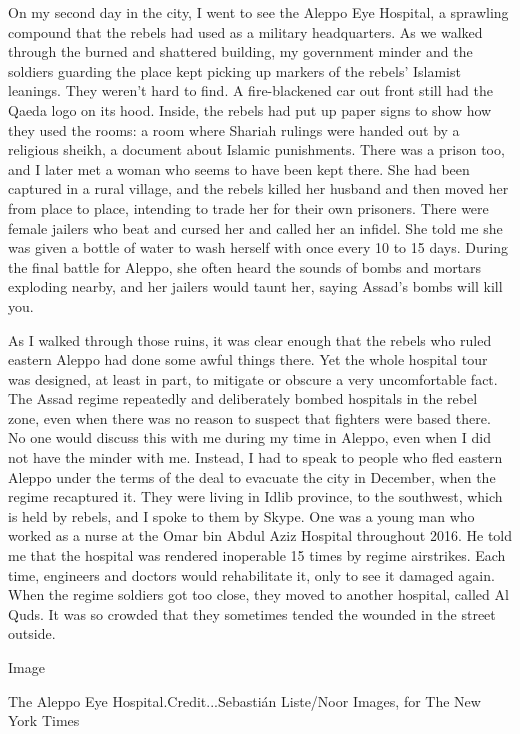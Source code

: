 On my second day in the city, I went to see the Aleppo Eye Hospital, a
sprawling compound that the rebels had used as a military headquarters.
As we walked through the burned and shattered building, my government
minder and the soldiers guarding the place kept picking up markers of
the rebels' Islamist leanings. They weren't hard to find. A
fire-blackened car out front still had the Qaeda logo on its hood.
Inside, the rebels had put up paper signs to show how they used the
rooms: a room where Shariah rulings were handed out by a religious
sheikh, a document about Islamic punishments. There was a prison too,
and I later met a woman who seems to have been kept there. She had been
captured in a rural village, and the rebels killed her husband and then
moved her from place to place, intending to trade her for their own
prisoners. There were female jailers who beat and cursed her and called
her an infidel. She told me she was given a bottle of water to wash
herself with once every 10 to 15 days. During the final battle for
Aleppo, she often heard the sounds of bombs and mortars exploding
nearby, and her jailers would taunt her, saying Assad's bombs will kill
you.

As I walked through those ruins, it was clear enough that the rebels who
ruled eastern Aleppo had done some awful things there. Yet the whole
hospital tour was designed, at least in part, to mitigate or obscure a
very uncomfortable fact. The Assad regime repeatedly and deliberately
bombed hospitals in the rebel zone, even when there was no reason to
suspect that fighters were based there. No one would discuss this with
me during my time in Aleppo, even when I did not have the minder with
me. Instead, I had to speak to people who fled eastern Aleppo under the
terms of the deal to evacuate the city in December, when the regime
recaptured it. They were living in Idlib province, to the southwest,
which is held by rebels, and I spoke to them by Skype. One was a young
man who worked as a nurse at the Omar bin Abdul Aziz Hospital throughout
2016. He told me that the hospital was rendered inoperable 15 times by
regime airstrikes. Each time, engineers and doctors would rehabilitate
it, only to see it damaged again. When the regime soldiers got too
close, they moved to another hospital, called Al Quds. It was so crowded
that they sometimes tended the wounded in the street outside.

Image

The Aleppo Eye Hospital.Credit...Sebastián Liste/Noor Images, for The
New York Times


